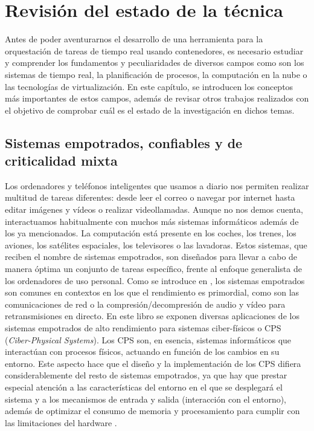 \chapter{Revisión del estado de la técnica}

Antes de poder aventurarnos el desarrollo de una herramienta para la
orquestación de tareas de tiempo real usando contenedores, es necesario
estudiar y comprender los fundamentos y peculiaridades de diversos campos como
son los sistemas de tiempo real, la planificación de procesos, la computación en
la nube o las tecnologías de virtualización. En este capítulo, se introducen los
conceptos más importantes de estos campos, además de revisar otros trabajos
realizados con el objetivo de comprobar cuál es el estado de la investigación
en dichos temas.

\section{Sistemas empotrados, confiables y de criticalidad mixta}

Los ordenadores y teléfonos inteligentes que usamos a diario nos permiten
realizar multitud de tareas diferentes: desde leer el correo o navegar por
internet hasta editar imágenes y vídeos o realizar videollamadas. Aunque no nos
demos cuenta, interactuamos habitualmente con muchos más sistemas informáticos
además de los ya mencionados. La computación está presente en los coches, los
trenes, los aviones, los satélites espaciales, los televisores o las lavadoras.
Estos sistemas, que reciben el nombre de sistemas empotrados, son diseñados para
llevar a cabo de manera óptima un conjunto de tareas específico, frente al
enfoque generalista de los ordenadores de uso personal. Como se introduce en
\cite{wolf_high-performance_2014}, los sistemas empotrados son comunes en
contextos en los que el rendimiento es primordial, como son las comunicaciones
de red o la compresión/decompresión de audio y vídeo para retransmisiones en
directo. En este libro se exponen diversas aplicaciones de los sistemas
empotrados de alto rendimiento para sistemas ciber-físicos o CPS
(\textit{Ciber-Physical Systems}). Los CPS son, en esencia, sistemas
informáticos que interactúan con procesos físicos, actuando en función de los
cambios en su entorno. Este aspecto hace que el diseño y la implementación de
los CPS difiera considerablemente del resto de sistemas empotrados, ya que hay
que prestar especial atención a las características del entorno en el que se
desplegará el sistema y a los mecanismos de entrada y salida (interacción con el
entorno), además de optimizar el consumo de memoria y procesamiento para cumplir
con las limitaciones del hardware \cite{lee_introduction_2016}.


